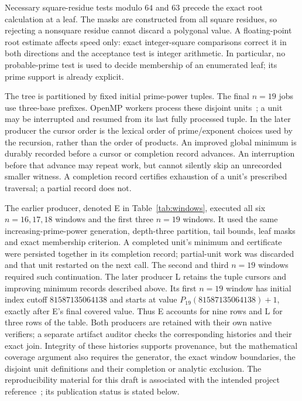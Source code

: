 \documentclass[11pt]{article}
\theoremstyle{remark}
\begin{document}
Necessary square-residue tests modulo $64$ and $63$ precede the exact root
calculation at a leaf. The masks are constructed from all square residues,
so rejecting a nonsquare residue cannot discard a polygonal value. A
floating-point root estimate affects speed only: exact integer-square
comparisons correct it in both directions and the acceptance test is integer
arithmetic. In particular, no probable-prime test is used to decide membership
of an enumerated leaf; its prime support is already explicit.

The tree is partitioned by fixed initial prime-power tuples. The final
$n=19$ jobs use three-base prefixes. OpenMP workers process these disjoint
units~\cite{gcc}; a unit may be interrupted and resumed from its last fully
processed tuple. In the later producer the cursor order is the lexical
order of prime/exponent choices used by the recursion, rather than the order
of products. An improved global minimum is durably recorded before a cursor
or completion record advances. An interruption before that advance may
repeat work, but cannot silently skip an unrecorded smaller witness. A
completion record certifies exhaustion of a unit's prescribed traversal;
a partial record does not.

The earlier producer, denoted E in Table~\ref{tab:windows}, executed all
six $n=16,17,18$ windows and the first three $n=19$ windows. It used the
same increasing-prime-power generation, depth-three partition, tail bounds,
leaf masks and exact membership criterion. A completed unit's minimum and
certificate were persisted together in its completion record; partial-unit
work was discarded and that unit restarted on the next call. The second
and third $n=19$ windows required such continuation. The later producer L
retains the tuple cursors and improving minimum records described above.
Its first $n=19$ window has initial index cutoff $81587135064138$ and starts
at value $P_{19}(81587135064138)+1$, exactly after E's final covered value.
Thus E accounts for nine rows and L for three rows of the table.
Both producers are retained with their own native verifiers; a separate
artifact auditor checks the corresponding histories and their exact join.
Integrity of these histories supports provenance, but the mathematical
coverage argument also requires the generator, the exact window boundaries,
the disjoint unit definitions and their completion or analytic exclusion.
The reproducibility material for this draft is associated with the intended
project reference~\cite{corti}; its publication status is stated below.
\end{document}
